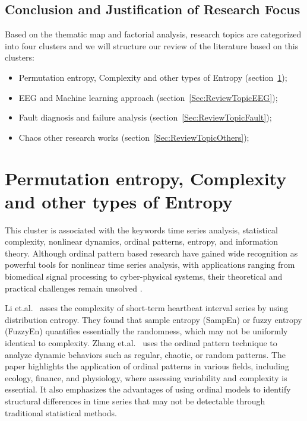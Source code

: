 \subsection{Conclusion and Justification of Research Focus}

Based on the thematic map and factorial analysis, research topics are categorized into four clusters and we will structure our review of the literature based on this clusters:

\begin{itemize}
	\item Permutation entropy, Complexity and other types of Entropy (section~\ref{Sec:ReviewTopicPE});
	\item EEG and Machine learning approach (section~\ref{Sec:ReviewTopicEEG});
	\item Fault diagnosis and failure analysis (section~\ref{Sec:ReviewTopicFault});
	\item Chaos other research works (section~\ref{Sec:ReviewTopicOthers});
\end{itemize}

\section{Permutation entropy, Complexity and other types of Entropy}\label{Sec:ReviewTopicPE}
This cluster is associated with the keywords time series analysis, statistical complexity, nonlinear dynamics, ordinal patterns, entropy, and information theory. Although ordinal pattern based research have gained wide recognition as powerful tools for nonlinear time series analysis, with applications ranging from biomedical signal processing to cyber-physical systems, their theoretical and practical challenges remain unsolved \cite{Keller2017, Zanin2012}. 

Li et.al.~\cite{Li2015e} asses the complexity of short-term heartbeat interval series by using distribution entropy. They found that sample entropy (SampEn) or fuzzy entropy (FuzzyEn) quantifies essentially the randomness, which may not be uniformly identical to complexity. Zhang et.al.~\cite{Zhang2018d} uses the ordinal pattern technique to analyze dynamic behaviors such as regular, chaotic, or random patterns. The paper highlights the application of ordinal patterns in various fields, including ecology, finance, and physiology, where assessing variability and complexity is essential. It also emphasizes the advantages of using ordinal models to identify structural differences in time series that may not be detectable through traditional statistical methods.


